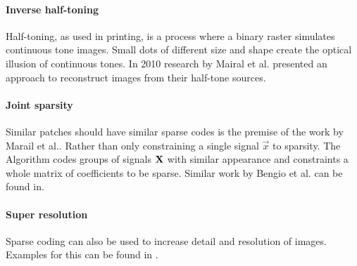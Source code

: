 \paragraph{Inverse half-toning} Half-toning, as used in printing, is a process
where a binary raster simulates continuous tone images. Small dots of different
size and shape create the optical illusion of continuous tones. In 2010 research
by Mairal et al.\cite{Mairal2010b} presented an approach to reconstruct images
from their half-tone sources.

\paragraph{Joint sparsity} Similar patches should have similar sparse
codes is the premise of the work by Marail et al.\cite{Mairal2009c}. Rather
than only constraining a single signal $\vec{x}$ to sparsity.
The Algorithm codes groups of signals $\boldsymbol{\mathrm{X}}$ with similar appearance and
constraints a whole matrix of coefficients to be sparse. Similar work by Bengio
et al. can be found in\cite{Bengio2009}.

\paragraph{Super resolution} Sparse coding can also be used to increase detail
and resolution of images. Examples for this can be found in
\cite{Wright2008,Yang2010,Yang2010}.







